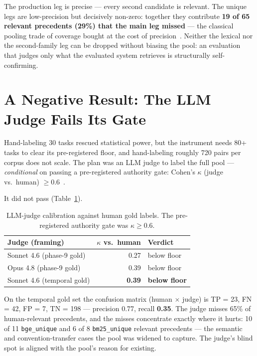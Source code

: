 \documentclass[sigconf,nonacm]{acmart}
\begin{document}
The production leg is precise --- every second candidate is relevant. The
unique legs are low-precision but decisively non-zero: together they
contribute \textbf{19 of 65 relevant precedents (29\%) that the main leg
missed} --- the classical pooling trade of coverage bought at the cost of
precision~\cite{zobel1998reliable}. Neither the lexical nor the
second-family leg can be dropped without biasing the pool: an evaluation
that judges only what the evaluated system retrieves is structurally
self-confirming.

\section{A Negative Result: The LLM Judge Fails Its Gate}
\label{sec:judge}

Hand-labeling 30 tasks rescued statistical power, but the instrument needs
80+ tasks to clear its pre-registered floor, and hand-labeling roughly 720
pairs per corpus does not scale. The plan was an LLM judge to label the
full pool --- \emph{conditional} on passing a pre-registered authority
gate: Cohen's $\kappa$ (judge vs.\ human) $\ge 0.6$~\cite{cohen1960}.

It did not pass (Table~\ref{tab:judge}).

\begin{table}[h]
  \caption{LLM-judge calibration against human gold labels. The
  pre-registered authority gate was $\kappa \ge 0.6$.}
  \label{tab:judge}
  \begin{tabular}{lrl}
    \toprule
    Judge (framing) & $\kappa$ vs.\ human & Verdict \\
    \midrule
    Sonnet 4.6 (phase-9 gold) & 0.27 & below floor \\
    Opus 4.8 (phase-9 gold) & 0.39 & below floor \\
    Sonnet 4.6 (temporal gold) & \textbf{0.39} & \textbf{below floor} \\
    \bottomrule
  \end{tabular}
\end{table}

On the temporal gold set the confusion matrix (human $\times$ judge) is
TP = 23, FN = 42, FP = 7, TN = 198 --- precision 0.77, recall
\textbf{0.35}. The judge misses 65\% of human-relevant precedents, and the
misses concentrate exactly where it hurts: 10 of 11 \texttt{bge\_unique}
and 6 of 8 \texttt{bm25\_unique} relevant precedents --- the semantic and
convention-transfer cases the pool was widened to capture. The judge's
blind spot is aligned with the pool's reason for existing.
\end{document}
